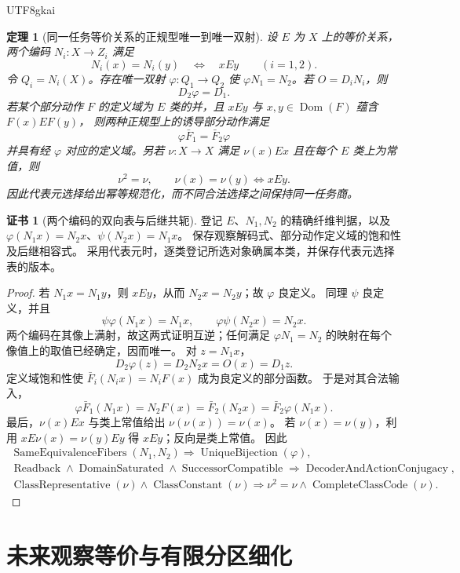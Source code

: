 \documentclass[12pt,a4paper,openany,notitlepage]{report}
\theoremstyle{plain}
\newtheorem{theorem}{定理}[chapter]
\theoremstyle{definition}
\newtheorem*{certificate}{证书}
\theoremstyle{remark}
\begin{document}
\begin{CJK*}{UTF8}{gkai}
\begin{theorem}[同一任务等价关系的正规型唯一到唯一双射]
\label{exp:gov:normalform-unique}
设 $E$ 为 $X$ 上的等价关系，两个编码 $N_i:X\to Z_i$ 满足
\[
 N_i(x)=N_i(y)\quad\Longleftrightarrow\quad xEy
 \qquad(i=1,2).
\]
令 $Q_i=N_i(X)$。存在唯一双射 $\varphi:Q_1\to Q_2$ 使
$\varphi N_1=N_2$。若 $O=D_iN_i$，则
\[
 D_2\varphi=D_1.
\]
若某个部分动作 $F$ 的定义域为 $E$ 类的并，且
$xEy$ 与 $x,y\in\operatorname{Dom}(F)$ 蕴含 $F(x)EF(y)$，
则两种正规型上的诱导部分动作满足
\[
 \varphi\bar F_1=\bar F_2\varphi
\]
并具有经 $\varphi$ 对应的定义域。另若 $\nu:X\to X$ 满足
$\nu(x)Ex$ 且在每个 $E$ 类上为常值，则
\[
 \nu^2=\nu,\qquad
 \nu(x)=\nu(y)\Longleftrightarrow xEy.
\]
因此代表元选择给出幂等规范化，而不同合法选择之间保持同一任务商。
\end{theorem}
\begin{certificate}[两个编码的双向表与后继共轭]
登记 $E$、$N_1,N_2$ 的精确纤维判据，以及
$\varphi(N_1x)=N_2x$、$\psi(N_2x)=N_1x$。
保存观察解码式、部分动作定义域的饱和性及后继相容式。
采用代表元时，逐类登记所选对象确属本类，并保存代表元选择表的版本。
\end{certificate}
\begin{proof}
若 $N_1x=N_1y$，则 $xEy$，从而 $N_2x=N_2y$；故 $\varphi$ 良定义。
同理 $\psi$ 良定义，并且
\[
 \psi\varphi(N_1x)=N_1x,\qquad
 \varphi\psi(N_2x)=N_2x.
\]
两个编码在其像上满射，故这两式证明互逆；任何满足
$\varphi N_1=N_2$ 的映射在每个像值上的取值已经确定，因而唯一。
对 $z=N_1x$，
\[
 D_2\varphi(z)=D_2N_2x=O(x)=D_1z.
\]
定义域饱和性使 $\bar F_i(N_ix)=N_iF(x)$ 成为良定义的部分函数。
于是对其合法输入，
\[
 \varphi\bar F_1(N_1x)=N_2F(x)
 =\bar F_2(N_2x)=\bar F_2\varphi(N_1x).
\]
最后，$\nu(x)Ex$ 与类上常值给出 $\nu(\nu(x))=\nu(x)$。
若 $\nu(x)=\nu(y)$，利用 $xE\nu(x)=\nu(y)Ey$ 得 $xEy$；反向是类上常值。
因此
\[
\begin{gathered}
 \operatorname{SameEquivalenceFibers}(N_1,N_2)
 \Rightarrow\operatorname{UniqueBijection}(\varphi),\\
 \operatorname{Readback}\land\operatorname{DomainSaturated}
 \land\operatorname{SuccessorCompatible}
 \Rightarrow\operatorname{DecoderAndActionConjugacy},\\
 \operatorname{ClassRepresentative}(\nu)\land\operatorname{ClassConstant}(\nu)
 \Rightarrow\nu^2=\nu\land\operatorname{CompleteClassCode}(\nu).
\end{gathered}
\]
\end{proof}

\section{未来观察等价与有限分区细化}
\label{exp:gov:refinement-section}


\end{CJK*}
\end{document}
